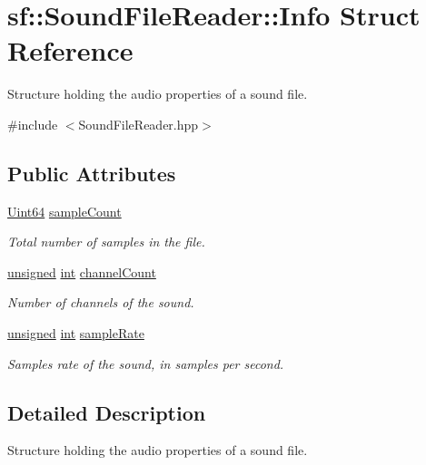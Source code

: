 \hypertarget{structsf_1_1_sound_file_reader_1_1_info}{\section{sf\-:\-:Sound\-File\-Reader\-:\-:Info Struct Reference}
\label{structsf_1_1_sound_file_reader_1_1_info}
}


Structure holding the audio properties of a sound file.  




{\ttfamily \#include $<$Sound\-File\-Reader.\-hpp$>$}

\subsection*{Public Attributes}
\begin{DoxyCompactItemize}
\item 
\hyperlink{namespacesf_add9ac83466d96b9f50a009b9f4064266}{Uint64} \hyperlink{structsf_1_1_sound_file_reader_1_1_info_a74b40b4693d7000571484736d1367167}{sample\-Count}
\begin{DoxyCompactList}\small\item\em Total number of samples in the file. \end{DoxyCompactList}\item 
\hyperlink{curses_8priv_8h_aca40206900cfc164654362fa8d4ad1e6}{unsigned} \hyperlink{term__entry_8h_ad65b480f8c8270356b45a9890f6499ae}{int} \hyperlink{structsf_1_1_sound_file_reader_1_1_info_ac748bb30768d1a3caf329e95d31d6d2a}{channel\-Count}
\begin{DoxyCompactList}\small\item\em Number of channels of the sound. \end{DoxyCompactList}\item 
\hyperlink{curses_8priv_8h_aca40206900cfc164654362fa8d4ad1e6}{unsigned} \hyperlink{term__entry_8h_ad65b480f8c8270356b45a9890f6499ae}{int} \hyperlink{structsf_1_1_sound_file_reader_1_1_info_a06ef71c19e7de190b294ae02c361f752}{sample\-Rate}
\begin{DoxyCompactList}\small\item\em Samples rate of the sound, in samples per second. \end{DoxyCompactList}\end{DoxyCompactItemize}


\subsection{Detailed Description}
Structure holding the audio properties of a sound file. 

